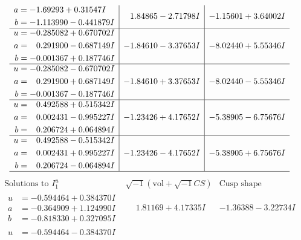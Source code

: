 \documentclass[1p]{elsarticle_modified}
\theoremstyle{definition}
\newcommand{\I}{\sqrt{-1}}
\begin{document}
$$\begin{array}{c|c|c}
\begin{aligned}
a &= -1.69293 + 0.31547 I \\
b &= -1.113990 - 0.441879 I\end{aligned}
 & \phantom{-}1.84865 - 2.71798 I & -1.15601 + 3.64002 I \\ \hline\begin{aligned}
u &= -0.285082 + 0.670702 I \\
a &= \phantom{-}0.291900 - 0.687149 I \\
b &= -0.001367 + 0.187746 I\end{aligned}
 & -1.84610 - 3.37653 I & -8.02440 + 5.55346 I \\ \hline\begin{aligned}
u &= -0.285082 - 0.670702 I \\
a &= \phantom{-}0.291900 + 0.687149 I \\
b &= -0.001367 - 0.187746 I\end{aligned}
 & -1.84610 + 3.37653 I & -8.02440 - 5.55346 I \\ \hline\begin{aligned}
u &= \phantom{-}0.492588 + 0.515342 I \\
a &= \phantom{-}0.002431 - 0.995227 I \\
b &= \phantom{-}0.206724 + 0.064894 I\end{aligned}
 & -1.23426 + 4.17652 I & -5.38905 - 6.75676 I \\ \hline\begin{aligned}
u &= \phantom{-}0.492588 - 0.515342 I \\
a &= \phantom{-}0.002431 + 0.995227 I \\
b &= \phantom{-}0.206724 - 0.064894 I\end{aligned}
 & -1.23426 - 4.17652 I & -5.38905 + 6.75676 I\\
 \hline 
 \end{array}$$\newpage$$\begin{array}{c|c|c}  
\text{Solutions to }I^u_{1}& \I (\text{vol} + \sqrt{-1}CS) & \text{Cusp shape}\\
 \hline 
\begin{aligned}
u &= -0.594464 + 0.384370 I \\
a &= -0.364909 + 1.124990 I \\
b &= -0.818330 + 0.327095 I\end{aligned}
 & \phantom{-}1.81169 + 4.17335 I & -1.36388 - 3.22734 I \\ \hline\begin{aligned}
u &= -0.594464 - 0.384370 I \\

\end{aligned}
\end{array}$$
\end{document}
